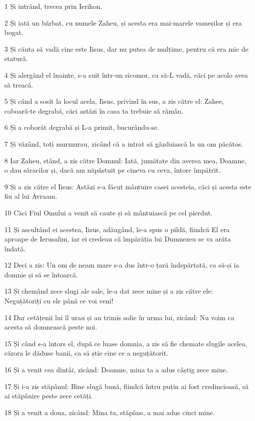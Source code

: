\par 1 Și intrând, trecea prin Ierihon.
\par 2 Și iată un bărbat, cu numele Zaheu, și acesta era mai-marele vameșilor și era bogat.
\par 3 Și căuta să vadă cine este Iisus, dar nu putea de mulțime, pentru că era mic de statură.
\par 4 Și alergând el înainte, s-a suit într-un sicomor, ca să-L vadă, căci pe acolo avea să treacă.
\par 5 Și când a sosit la locul acela, Iisus, privind în sus, a zis către el: Zahee, coboară-te degrabă, căci astăzi în casa ta trebuie să rămân.
\par 6 Și a coborât degrabă și L-a primit, bucurându-se.
\par 7 Și văzând, toți murmurau, zicând că a intrat să găzduiască la un om păcătos.
\par 8 Iar Zaheu, stând, a zis către Domnul: Iată, jumătate din averea mea, Doamne, o dau săracilor și, dacă am năpăstuit pe cineva cu ceva, întorc împătrit.
\par 9 Și a zis către el Iisus: Astăzi s-a făcut mântuire casei acesteia, căci și acesta este fiu al lui Avraam.
\par 10 Căci Fiul Omului a venit să caute și să mântuiască pe cel pierdut.
\par 11 Și ascultând ei acestea, Iisus, adăugând, le-a spus o pildă, fiindcă El era aproape de Ierusalim, iar ei credeau că împărăția lui Dumnezeu se va arăta îndată.
\par 12 Deci a zis: Un om de neam mare s-a dus într-o țară îndepărtată, ca să-și ia domnie și să se întoarcă.
\par 13 Și chemând zece slugi ale sale, le-a dat zece mine și a zis către ele: Neguțătoriți cu ele până ce voi veni!
\par 14 Dar cetățenii lui îl urau și au trimis solie în urma lui, zicând: Nu voim ca acesta să domnească peste noi.
\par 15 Și când s-a întors el, după ce luase domnia, a zis să fie chemate slugile acelea, cărora le dăduse banii, ca să știe cine ce a neguțătorit.
\par 16 Și a venit cea dintâi, zicând: Doamne, mina ta a adus câștig zece mine.
\par 17 Și i-a zis stăpânul: Bine slugă bună, fiindcă întru puțin ai fost credincioasă, să ai stăpânire peste zece cetăți.
\par 18 Și a venit a doua, zicând: Mina ta, stăpâne, a mai adus cinci mine.
